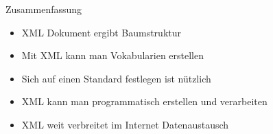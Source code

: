 \documentclass{beamer}
\begin{document}
\begin{frame}{Zusammenfassung}
	
	\begin{itemize}
		\item XML Dokument ergibt Baumstruktur
		\item Mit XML kann man Vokabularien erstellen
		\item Sich auf einen Standard festlegen ist nützlich
		\item XML kann man programmatisch erstellen und verarbeiten
		\item XML weit verbreitet im Internet Datenaustausch
	\end{itemize}
	
\end{frame}
\end{document}

